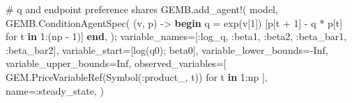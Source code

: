 \documentclass[
  letterpaper,
  DIV=11,
  numbers=noendperiod]{scrreprt}
\newenvironment{Shaded}{\begin{snugshade}}{\end{snugshade}}
\newcommand{\CommentTok}[1]{\textcolor[rgb]{0.37,0.37,0.37}{#1}}
\newcommand{\ConstantTok}[1]{\textcolor[rgb]{0.56,0.35,0.01}{#1}}
\newcommand{\ControlFlowTok}[1]{\textcolor[rgb]{0.00,0.23,0.31}{\textbf{#1}}}
\newcommand{\FloatTok}[1]{\textcolor[rgb]{0.68,0.00,0.00}{#1}}
\newcommand{\FunctionTok}[1]{\textcolor[rgb]{0.28,0.35,0.67}{#1}}
\newcommand{\KeywordTok}[1]{\textcolor[rgb]{0.00,0.23,0.31}{\textbf{#1}}}
\newcommand{\NormalTok}[1]{\textcolor[rgb]{0.00,0.23,0.31}{#1}}
\newcommand{\OperatorTok}[1]{\textcolor[rgb]{0.37,0.37,0.37}{#1}}
\begin{document}
\begin{codelisting}
{\begin{Shaded}
\begin{Highlighting}[]
    \CommentTok{\# q and endpoint preference shares}
\NormalTok{    GEMB.}\FunctionTok{add\_agent!}\NormalTok{(}
\NormalTok{        model,}
\NormalTok{        GEMB.}\FunctionTok{ConditionAgentSpec}\NormalTok{(}
\NormalTok{            (v, p) }\OperatorTok{{-}\textgreater{}} \ControlFlowTok{begin}
\NormalTok{                q }\OperatorTok{=} \FunctionTok{exp}\NormalTok{(v[}\FloatTok{1}\NormalTok{])}
\NormalTok{                [p[t }\OperatorTok{+} \FloatTok{1}\NormalTok{] }\OperatorTok{{-}}\NormalTok{ q }\OperatorTok{*}\NormalTok{ p[t] for t }\KeywordTok{in} \FloatTok{1}\OperatorTok{:}\NormalTok{(np }\OperatorTok{{-}} \FloatTok{1}\NormalTok{)]}
            \ControlFlowTok{end}\NormalTok{,}
\NormalTok{        );}
\NormalTok{        variable\_names}\OperatorTok{=}\NormalTok{[}\OperatorTok{:}\NormalTok{log\_q, }\OperatorTok{:}\NormalTok{beta1, }\OperatorTok{:}\NormalTok{beta2, }\OperatorTok{:}\NormalTok{beta\_bar1, }\OperatorTok{:}\NormalTok{beta\_bar2],}
\NormalTok{        variable\_start}\OperatorTok{=}\NormalTok{[}\FunctionTok{log}\NormalTok{(q0); beta0],}
\NormalTok{        variable\_lower\_bounds}\OperatorTok{={-}}\ConstantTok{Inf}\NormalTok{,}
\NormalTok{        variable\_upper\_bounds}\OperatorTok{=}\ConstantTok{Inf}\NormalTok{,}
\NormalTok{        observed\_variables}\OperatorTok{=}\NormalTok{[}
\NormalTok{            GEM.}\FunctionTok{PriceVariableRef}\NormalTok{(}\FunctionTok{Symbol}\NormalTok{(}\OperatorTok{:}\NormalTok{product\_, t))}
\NormalTok{            for t }\KeywordTok{in} \FloatTok{1}\OperatorTok{:}\NormalTok{np}
\NormalTok{        ],}
\NormalTok{        name}\OperatorTok{=:}\NormalTok{steady\_state,}
\NormalTok{    )}


\end{Highlighting}
\end{Shaded}}
\end{codelisting}
\end{document}
